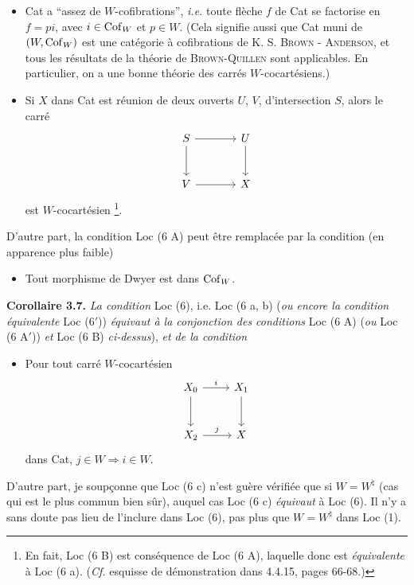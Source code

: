 \begin{itemize}[leftmargin=7em, labelwidth=6em]
\item[\textbf{Loc (6 A)}] Cat a “assez de $W$-cofibrations”,
\textit{i.e.} toute flèche $f$ de Cat se factorise en $f = pi$, avec $i \in \mathrm{Cof}_W$ et $p \in W$. (Cela signifie aussi que Cat muni de $(W, \mathrm{Cof}_W)$ est une catégorie à cofibrations de K. S. \textsc{Brown} - \textsc{Anderson}, et tous les résultats de la théorie de \textsc{Brown-Quillen} sont applicables. En particulier, on a une bonne théorie des carrés $W$-cocartésiens.)
\item[\textbf{Loc (6 B)}] Si $X$ dans Cat est réunion de deux ouverts $U$, $V$, d'intersection $S$, alors le carré
\[
\begin{tikzcd}[ampersand replacement=\&, row sep=large, column sep=large]
S \arrow[r] \arrow[d] \& U \arrow[d] \\
V \arrow[r] \& X
\end{tikzcd}
\]
est $W$-cocartésien \footnote[19]{En fait, Loc (6 B) est conséquence de Loc (6 A), laquelle donc est \textit{équivalente} à Loc (6 a). (\textit{Cf.} esquisse de démonstration dans 4.4.15, pages 66-68.)}.
\end{itemize}
D'autre part, la condition Loc (6 A) peut être remplacée par la condition (en apparence plus faible)
\begin{itemize}[leftmargin=7em, labelwidth=6em]
\item[\textbf{Loc (6 A$'$)}] Tout morphisme de Dwyer est dans $\mathrm{Cof}_W$.
\end{itemize}
\textbf{Corollaire 3.7.} \textit{La condition} Loc (6), i.e. Loc (6 a, b) (\textit{ou encore la condition équivalente} Loc (6$'$)) \textit{équivaut à la conjonction des conditions} Loc (6 A) (\textit{ou} Loc (6 A$'$)) \textit{et} Loc (6 B) \textit{ci-dessus}), \textit{et de la condition}
\begin{itemize}[leftmargin=7em, labelwidth=6em]
\item[\textbf{Loc (6 C)}] Pour tout carré $W$-cocartésien
\[
\begin{tikzcd}[ampersand replacement=\&, row sep=large]
X_0 \arrow[r, "i"] \arrow[d] \& X_1 \arrow[d] \\
X_2 \arrow[r, "j"] \& X
\end{tikzcd}
\]
dans Cat, $j \in W \Longrightarrow i \in W$.
\end{itemize}
D'autre part, je soupçonne que Loc (6 c) n'est guère vérifiée que si $W = W^{\natural}$ (cas qui est le plus commun bien sûr), auquel cas Loc (6 c) \textit{équivaut} à Loc (6). Il n'y a sans doute pas lieu de l'inclure dans Loc (6), pas plus que $W = W^{\natural}$ dans Loc (1).


